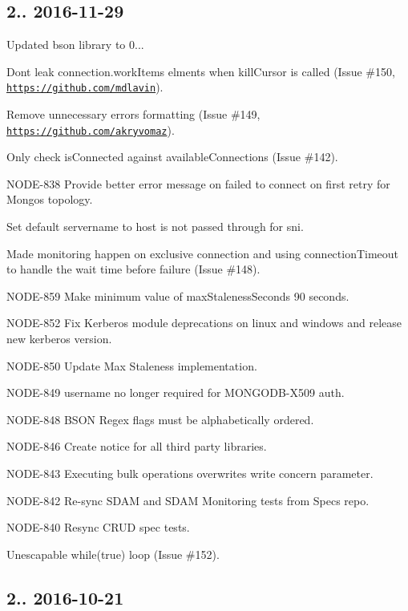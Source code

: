 \subsection*{2.. 2016-\/11-\/29 }


\begin{DoxyItemize}
\item Updated bson library to 0...
\item Dont leak connection.\+work\+Items elments when kill\+Cursor is called (Issue \#150, \href{https://github.com/mdlavin}{\tt https\+://github.\+com/mdlavin}).
\item Remove unnecessary errors formatting (Issue \#149, \href{https://github.com/akryvomaz}{\tt https\+://github.\+com/akryvomaz}).
\item Only check is\+Connected against available\+Connections (Issue \#142).
\item N\+O\+D\+E-\/838 Provide better error message on failed to connect on first retry for Mongos topology.
\item Set default servername to host is not passed through for sni.
\item Made monitoring happen on exclusive connection and using connection\+Timeout to handle the wait time before failure (Issue \#148).
\item N\+O\+D\+E-\/859 Make minimum value of max\+Staleness\+Seconds 90 seconds.
\item N\+O\+D\+E-\/852 Fix Kerberos module deprecations on linux and windows and release new kerberos version.
\item N\+O\+D\+E-\/850 Update Max Staleness implementation.
\item N\+O\+D\+E-\/849 username no longer required for M\+O\+N\+G\+O\+D\+B-\/\+X509 auth.
\item N\+O\+D\+E-\/848 B\+S\+ON Regex flags must be alphabetically ordered.
\item N\+O\+D\+E-\/846 Create notice for all third party libraries.
\item N\+O\+D\+E-\/843 Executing bulk operations overwrites write concern parameter.
\item N\+O\+D\+E-\/842 Re-\/sync S\+D\+AM and S\+D\+AM Monitoring tests from Specs repo.
\item N\+O\+D\+E-\/840 Resync C\+R\+UD spec tests.
\item Unescapable while(true) loop (Issue \#152).
\end{DoxyItemize}

\subsection*{2.. 2016-\/10-\/21 }


